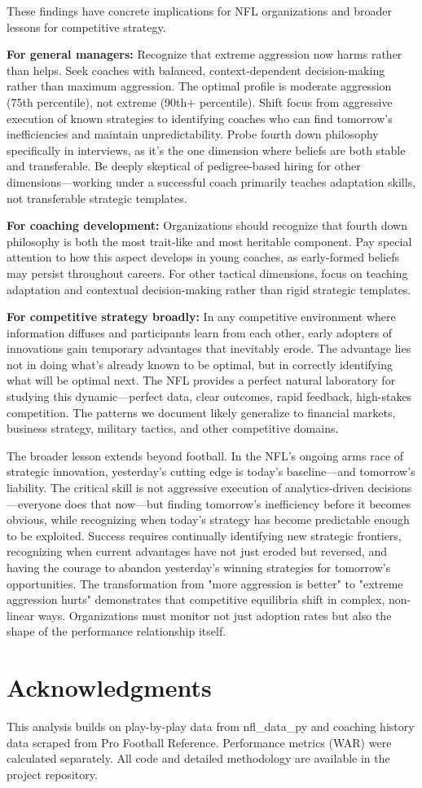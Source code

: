 \documentclass[11pt,twocolumn]{article}
\begin{document}
These findings have concrete implications for NFL organizations and broader lessons for competitive strategy.

\textbf{For general managers:} Recognize that extreme aggression now harms rather than helps. Seek coaches with balanced, context-dependent decision-making rather than maximum aggression. The optimal profile is moderate aggression (75th percentile), not extreme (90th+ percentile). Shift focus from aggressive execution of known strategies to identifying coaches who can find tomorrow's inefficiencies and maintain unpredictability. Probe fourth down philosophy specifically in interviews, as it's the one dimension where beliefs are both stable and transferable. Be deeply skeptical of pedigree-based hiring for other dimensions---working under a successful coach primarily teaches adaptation skills, not transferable strategic templates.

\textbf{For coaching development:} Organizations should recognize that fourth down philosophy is both the most trait-like and most heritable component. Pay special attention to how this aspect develops in young coaches, as early-formed beliefs may persist throughout careers. For other tactical dimensions, focus on teaching adaptation and contextual decision-making rather than rigid strategic templates.

\textbf{For competitive strategy broadly:} In any competitive environment where information diffuses and participants learn from each other, early adopters of innovations gain temporary advantages that inevitably erode. The advantage lies not in doing what's already known to be optimal, but in correctly identifying what will be optimal next. The NFL provides a perfect natural laboratory for studying this dynamic---perfect data, clear outcomes, rapid feedback, high-stakes competition. The patterns we document likely generalize to financial markets, business strategy, military tactics, and other competitive domains.

The broader lesson extends beyond football. In the NFL's ongoing arms race of strategic innovation, yesterday's cutting edge is today's baseline---and tomorrow's liability. The critical skill is not aggressive execution of analytics-driven decisions---everyone does that now---but finding tomorrow's inefficiency before it becomes obvious, while recognizing when today's strategy has become predictable enough to be exploited. Success requires continually identifying new strategic frontiers, recognizing when current advantages have not just eroded but reversed, and having the courage to abandon yesterday's winning strategies for tomorrow's opportunities. The transformation from "more aggression is better" to "extreme aggression hurts" demonstrates that competitive equilibria shift in complex, non-linear ways. Organizations must monitor not just adoption rates but also the shape of the performance relationship itself.

\section*{Acknowledgments}

This analysis builds on play-by-play data from nfl\_data\_py and coaching history data scraped from Pro Football Reference. Performance metrics (WAR) were calculated separately. All code and detailed methodology are available in the project repository.
\end{document}

